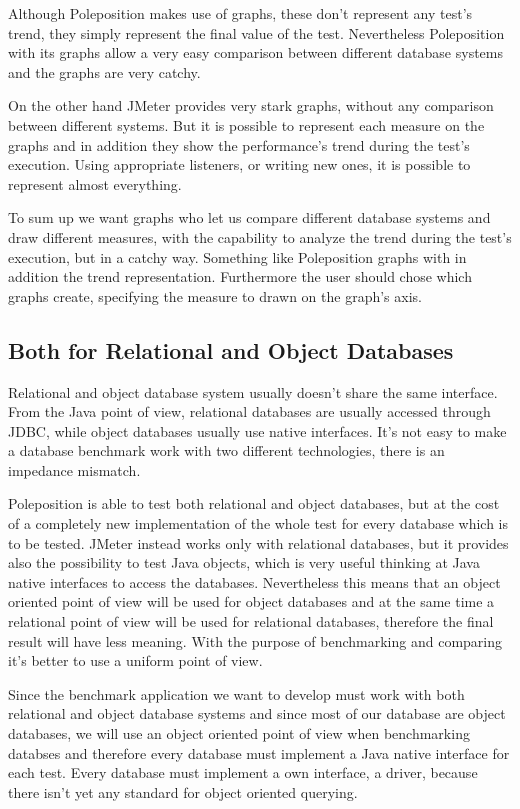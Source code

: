 Although Poleposition makes use of graphs, these don't represent any test's trend, they simply represent the final value of the test. Nevertheless Poleposition with its graphs allow a very easy comparison between different database systems and the graphs are very catchy.

On the other hand JMeter provides very stark graphs, without any comparison between different systems. But it is possible to represent each measure on the graphs and in addition they show the performance's trend during the test's execution. Using appropriate listeners, or writing new ones, it is possible to represent almost everything.

To sum up we want graphs who let us compare different database systems and draw different measures, with the capability to analyze the trend during the test's execution, but in a catchy way. Something like Poleposition graphs with in addition the trend representation. Furthermore the user should chose which graphs create, specifying the measure to drawn on the graph's axis.
			 
		\subsection{Both for Relational and Object Databases}
Relational and object database system usually doesn't share the same interface. From the Java point of view, relational databases are usually accessed through JDBC, while object databases usually use native interfaces. It's not easy to make a database benchmark work with two different technologies, there is an impedance mismatch. 

Poleposition is able to test both relational and object databases, but at the cost of a completely new implementation of the whole test for every database which is to be tested. JMeter instead works only with relational databases, but it provides also the possibility to test Java objects, which is very useful thinking at Java native interfaces to access the databases. Nevertheless this means that an object oriented point of view will be used for object databases and at the same time a relational point of view will be used for relational databases, therefore the final result will have less meaning. With the purpose of benchmarking and comparing it's better to use a uniform point of view.

Since the benchmark application we want to develop must work with both relational and object database systems and since most of our database are object databases, we will use an object oriented point of view when benchmarking databses and therefore every database must implement a Java native interface for each test. Every database must implement a own interface, a driver, because there isn't yet any standard for object oriented querying.
			 

